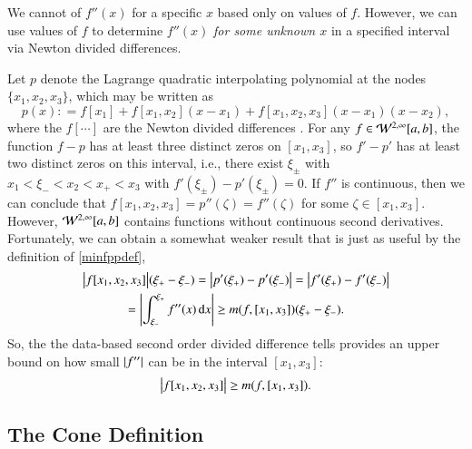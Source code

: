 \documentclass[review]{elsarticle}
\begin{document}
We cannot of $f''(x)$ for a specific $x$ based only on values of $f$.  However, we can use values of $f$ to determine $f''(x)$ \emph{for some unknown $x$} in a specified interval via Newton divided differences.  


Let  $p$ denote the Lagrange quadratic interpolating polynomial at the nodes $\{x_1, x_2, x_3\}$, which may be written as
\begin{equation*}
p(x) : = f[x_1] + f[x_1, x_2](x-x_1) + f[x_1, x_2, x_3](x-x_1)(x-x_2), 
\end{equation*}
where the $f[\cdots]$ are the Newton divided differences \cite{}.  For any $f \in \mathcal{W}^{2,\infty}[a,b]$, the function $f - p$ has at least three distinct zeros on $[x_1, x_3]$, so $f' - p'$ has at least two distinct zeros on this interval, i.e., there exist $\xi_\pm$ with $x_1 < \xi_- < x_2 < x_+ < x_3$ with $f'(\xi_\pm) - p'(\xi_{\pm}) = 0$.  If $f''$ is  continuous, then we can conclude that $ f[x_1, x_2, x_3]= p''(\zeta) =f''(\zeta) $ for some $\zeta \in [x_1, x_3]$. However,  $\mathcal{W}^{2,\infty}[a,b]$ contains functions without continuous second derivatives.  Fortunately, we can obtain a somewhat weaker result that is just as useful by the definition of \eqref{minfppdef}, 
\begin{multline*}
\bigl \lvert f[x_1, x_2, x_3] \bigr \rvert(\xi_+  - \xi_-) = \left \lvert p'(\xi_+) - p'(\xi_-) \right \rvert =  \left \lvert f'(\xi_+) - f'(\xi_-) \right \rvert \\
= \left \lvert \int_{\xi_-}^{\xi_+} f''(x) \, {\rm d} x \right \rvert \ge m(f,[x_1, x_3]) (\xi_+  - \xi_-).
\end{multline*}
So, the the data-based second order divided difference tells provides an upper bound on how small  $\left \lvert f'' \right \rvert$ can be in the interval $[x_1, x_3]$:
\begin{equation}
\bigl \lvert f[x_1, x_2, x_3] \bigr \rvert \ge m(f,[x_1, x_3]).
\end{equation}

\subsection{The Cone Definition}  \label{sec:conedef}
\end{document}
